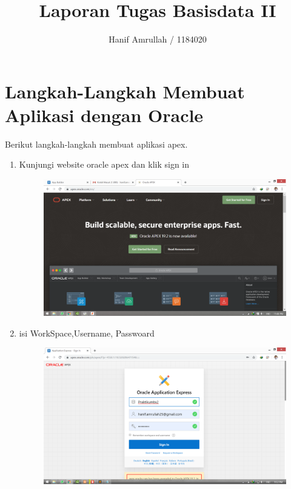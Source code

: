 \documentclass[11pt]{article}
\title{Laporan Tugas Basisdata II}
\author{Hanif Amrullah / 1184020}
\begin{document}
\maketitle

\section{Langkah-Langkah Membuat Aplikasi dengan Oracle}
Berikut langkah-langkah membuat aplikasi apex.
\begin{enumerate}

\item 
Kunjungi website oracle apex dan klik sign in
\begin{figure}[h]
\centerline {\includegraphics[scale=0.1]{img/web.png}}
\caption{}
\label{langkah1}
\end{figure}

\item isi WorkSpace,Username, Passwoard
\begin{figure}
        \centerline{\includegraphics[scale=0.1]{img/1login.png}}
        \caption{}
		\label{langkah2}
\end{figure}


\end{enumerate}
\end{document}
